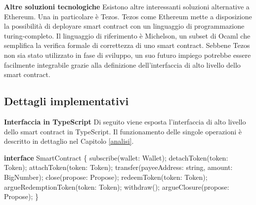 \documentclass[12pt,italian,]{book}
\newenvironment{Shaded}{}{}
\newcommand{\AttributeTok}[1]{\textcolor[rgb]{0.49,0.56,0.16}{#1}}
\newcommand{\DataTypeTok}[1]{\textcolor[rgb]{0.56,0.13,0.00}{#1}}
\newcommand{\KeywordTok}[1]{\textcolor[rgb]{0.00,0.44,0.13}{\textbf{#1}}}
\newcommand{\NormalTok}[1]{#1}
\newcommand{\OperatorTok}[1]{\textcolor[rgb]{0.40,0.40,0.40}{#1}}
\begin{document}
\textbf{\textbf{Altre soluzioni tecnologiche}} Esistono altre interessanti soluzioni alternative a Ethereum. Una in particolare è Tezos. Tezos come Ethereum mette a disposizione la possibilità di deployare smart contract con un linguaggio di programmazione turing-completo. Il linguaggio di riferimento è Michelson, un subset di Ocaml che semplifica la verifica formale di correttezza di uno smart contract. Sebbene Tezos non sia stato utilizzato in fase di sviluppo, un suo futuro impiego potrebbe essere facilmente integrabile grazie alla definizione dell'interfaccia di alto livello dello smart contract.

\hypertarget{dettagli-implementativi}{%
\subsection{Dettagli implementativi}\label{dettagli-implementativi}}

\textbf{\textbf{Interfaccia in TypeScript}} Di seguito viene esposta l'interfaccia di alto livello dello smart contract in TypeScript. Il funzionamento delle singole operazioni è descritto in dettaglio nel Capitolo \ref{analisi}.

\begin{Shaded}
\begin{Highlighting}[]
\KeywordTok{interface}\NormalTok{ SmartContract }\OperatorTok{\{}
    \AttributeTok{subscribe}\NormalTok{(}\DataTypeTok{wallet}\OperatorTok{:}\NormalTok{ Wallet)}\OperatorTok{;}
    \AttributeTok{detachToken}\NormalTok{(}\DataTypeTok{token}\OperatorTok{:}\NormalTok{ Token)}\OperatorTok{;}
    \AttributeTok{attachToken}\NormalTok{(}\DataTypeTok{token}\OperatorTok{:}\NormalTok{ Token)}\OperatorTok{;}
    \AttributeTok{transfer}\NormalTok{(}\DataTypeTok{payeeAddress}\OperatorTok{:}\NormalTok{ string}\OperatorTok{,} \DataTypeTok{amount}\OperatorTok{:}\NormalTok{ BigNumber)}\OperatorTok{;}
    \AttributeTok{close}\NormalTok{(}\DataTypeTok{propose}\OperatorTok{:}\NormalTok{ Propose)}\OperatorTok{;}
    \AttributeTok{redeemToken}\NormalTok{(}\DataTypeTok{token}\OperatorTok{:}\NormalTok{ Token)}\OperatorTok{;}
    \AttributeTok{argueRedemptionToken}\NormalTok{(}\DataTypeTok{token}\OperatorTok{:}\NormalTok{ Token)}\OperatorTok{;}
    \AttributeTok{withdraw}\NormalTok{()}\OperatorTok{;}
    \AttributeTok{argueClosure}\NormalTok{(}\DataTypeTok{propose}\OperatorTok{:}\NormalTok{ Propose)}\OperatorTok{;}
\OperatorTok{\}}
\end{Highlighting}
\end{Shaded}
\end{document}
